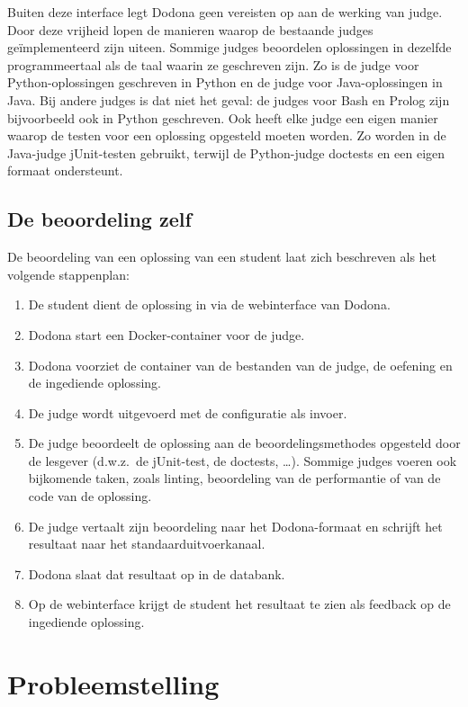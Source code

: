 Buiten deze interface legt Dodona geen vereisten op aan de werking van judge.
Door deze vrijheid lopen de manieren waarop de bestaande judges geïmplementeerd zijn uiteen.
Sommige judges beoordelen oplossingen in dezelfde programmeertaal als de taal waarin ze geschreven zijn.
Zo is de judge voor Python-oplossingen geschreven in Python en de judge voor Java-oplossingen in Java.
Bij andere judges is dat niet het geval: de judges voor Bash en Prolog zijn bijvoorbeeld ook in Python geschreven.
Ook heeft elke judge een eigen manier waarop de testen voor een oplossing opgesteld moeten worden.
Zo worden in de Java-judge jUnit-testen gebruikt, terwijl de Python-judge doctests en een eigen formaat ondersteunt.

\subsection{De beoordeling zelf}\label{subsec:de-beoordeling-zelf}

De beoordeling van een oplossing van een student laat zich beschreven als het volgende stappenplan:

\begin{enumerate}
    \item De student dient de oplossing in via de webinterface van Dodona.
    \item Dodona start een Docker-container voor de judge.
    \item Dodona voorziet de container van de bestanden van de judge, de oefening en de ingediende oplossing.
    \item De judge wordt uitgevoerd met de configuratie als invoer.
    \item De judge beoordeelt de oplossing aan de beoordelingsmethodes opgesteld door de lesgever (d.w.z.\ de jUnit-test, de doctests, \ldots).
    Sommige judges voeren ook bijkomende taken, zoals linting, beoordeling van de performantie of  van de code van de oplossing.
    \item De judge vertaalt zijn beoordeling naar het Dodona-formaat en schrijft het resultaat naar het standaarduitvoerkanaal.
    \item Dodona slaat dat resultaat op in de databank.
    \item Op de webinterface krijgt de student het resultaat te zien als feedback op de ingediende oplossing.
\end{enumerate}



\section{Probleemstelling}\label{sec:probleemstelling}

